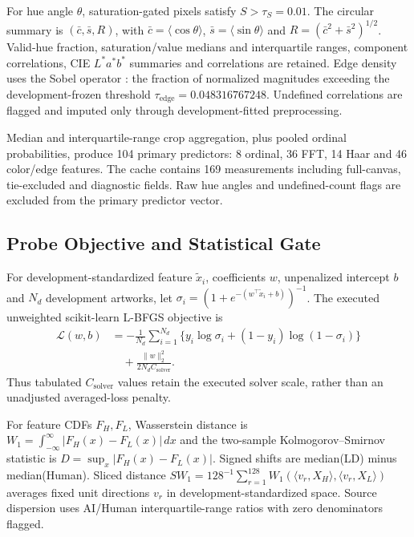 \documentclass[journal,twoside,web]{IEEEtran}
\begin{document}
For hue angle $\theta$, saturation-gated pixels satisfy $S>\tau_S=0.01$. The circular summary is $(\bar c,\bar s,R)$, with $\bar c=\langle\cos\theta\rangle$, $\bar s=\langle\sin\theta\rangle$ and $R=(\bar c^2+\bar s^2)^{1/2}$. Valid-hue fraction, saturation/value medians and interquartile ranges, component correlations, CIE $L^*a^*b^*$ summaries and correlations are retained. Edge density uses the Sobel operator \cite{imaging}: the fraction of normalized magnitudes exceeding the development-frozen threshold $\tau_{\mathrm{edge}}=0.048316767248$. Undefined correlations are flagged and imputed only through development-fitted preprocessing.

Median and interquartile-range crop aggregation, plus pooled ordinal probabilities, produce 104 primary predictors: 8 ordinal, 36 FFT, 14 Haar and 46 color/edge features. The cache contains 169 measurements including full-canvas, tie-excluded and diagnostic fields. Raw hue angles and undefined-count flags are excluded from the primary predictor vector.

\subsection{Probe Objective and Statistical Gate}
For development-standardized feature $\tilde x_i$, coefficients $w$, unpenalized intercept $b$ and $N_d$ development artworks, let $\sigma_i=(1+e^{-(w^\top\tilde x_i+b)})^{-1}$. The executed unweighted scikit-learn \cite{sklearn} L-BFGS objective is
\begin{align}
\mathcal L(w,b)&=-\frac{1}{N_d}\sum_{i=1}^{N_d}\{y_i\log\sigma_i+(1-y_i)\log(1-\sigma_i)\}\nonumber\\
&\quad+\frac{\|w\|_2^2}{2N_d C_{\mathrm{solver}}}.
\end{align}
Thus tabulated $C_{\mathrm{solver}}$ values retain the executed solver scale, rather than an unadjusted averaged-loss penalty.

For feature CDFs $F_H,F_L$, Wasserstein distance \cite{ot} is $W_1=\int_{-\infty}^{\infty}|F_H(x)-F_L(x)|\,dx$ and the two-sample Kolmogorov--Smirnov statistic \cite{ks} is $D=\sup_x|F_H(x)-F_L(x)|$. Signed shifts are median(LD) minus median(Human). Sliced distance $SW_1=128^{-1}\sum_{r=1}^{128}W_1(\langle v_r,X_H\rangle,\langle v_r,X_L\rangle)$ averages fixed unit directions $v_r$ in development-standardized space. Source dispersion uses AI/Human interquartile-range ratios with zero denominators flagged.
\end{document}
